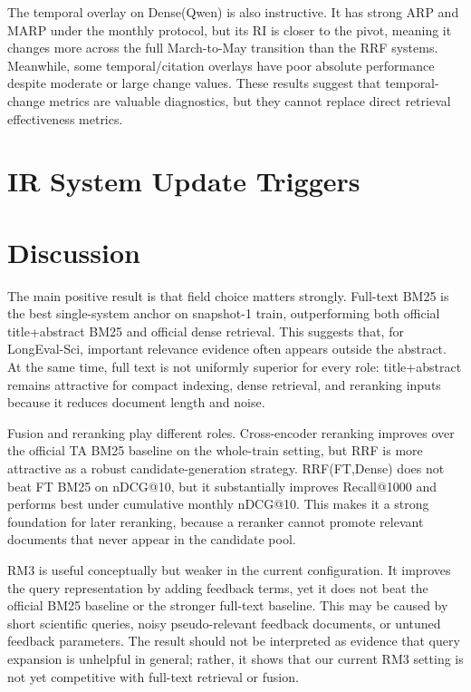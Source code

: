 \documentclass[11pt]{article}
\begin{document}
The temporal overlay on Dense(Qwen) is also instructive. It has strong ARP and MARP under the monthly protocol, but its RI is closer to the pivot, meaning it changes more across the full March-to-May transition than the RRF systems. Meanwhile, some temporal/citation overlays have poor absolute performance despite moderate or large change values. These results suggest that temporal-change metrics are valuable diagnostics, but they cannot replace direct retrieval effectiveness metrics.

\section{IR System Update Triggers}
\label{sec:update-triggers}

\section{Discussion}

The main positive result is that field choice matters strongly. Full-text BM25 is the best single-system anchor on snapshot-1 train, outperforming both official title+abstract BM25 and official dense retrieval. This suggests that, for LongEval-Sci, important relevance evidence often appears outside the abstract. At the same time, full text is not uniformly superior for every role: title+abstract remains attractive for compact indexing, dense retrieval, and reranking inputs because it reduces document length and noise.

Fusion and reranking play different roles. Cross-encoder reranking improves over the official TA BM25 baseline on the whole-train setting, but RRF is more attractive as a robust candidate-generation strategy. RRF(FT,Dense) does not beat FT BM25 on nDCG@10, but it substantially improves Recall@1000 and performs best under cumulative monthly nDCG@10. This makes it a strong foundation for later reranking, because a reranker cannot promote relevant documents that never appear in the candidate pool.

RM3 is useful conceptually but weaker in the current configuration. It improves the query representation by adding feedback terms, yet it does not beat the official BM25 baseline or the stronger full-text baseline. This may be caused by short scientific queries, noisy pseudo-relevant feedback documents, or untuned feedback parameters. The result should not be interpreted as evidence that query expansion is unhelpful in general; rather, it shows that our current RM3 setting is not yet competitive with full-text retrieval or fusion.
\end{document}
